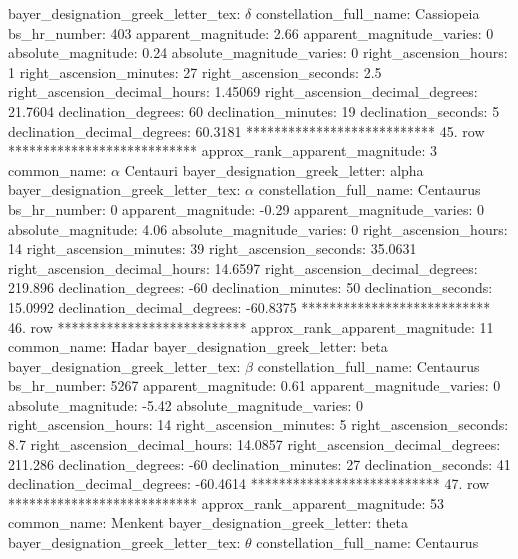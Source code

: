bayer_designation_greek_letter_tex: $\delta$
           constellation_full_name: Cassiopeia
                      bs_hr_number: 403
                apparent_magnitude: 2.66
         apparent_magnitude_varies: 0
                absolute_magnitude: 0.24
         absolute_magnitude_varies: 0
             right_ascension_hours: 1
           right_ascension_minutes: 27
           right_ascension_seconds: 2.5
     right_ascension_decimal_hours: 1.45069
   right_ascension_decimal_degrees: 21.7604
               declination_degrees: 60
               declination_minutes: 19
               declination_seconds: 5
       declination_decimal_degrees: 60.3181
*************************** 45. row ***************************
    approx_rank_apparent_magnitude: 3
                       common_name: $\alpha$ Centauri
    bayer_designation_greek_letter: alpha
bayer_designation_greek_letter_tex: $\alpha$
           constellation_full_name: Centaurus
                      bs_hr_number: 0
                apparent_magnitude: -0.29
         apparent_magnitude_varies: 0
                absolute_magnitude: 4.06
         absolute_magnitude_varies: 0
             right_ascension_hours: 14
           right_ascension_minutes: 39
           right_ascension_seconds: 35.0631
     right_ascension_decimal_hours: 14.6597
   right_ascension_decimal_degrees: 219.896
               declination_degrees: -60
               declination_minutes: 50
               declination_seconds: 15.0992
       declination_decimal_degrees: -60.8375
*************************** 46. row ***************************
    approx_rank_apparent_magnitude: 11
                       common_name: Hadar
    bayer_designation_greek_letter: beta
bayer_designation_greek_letter_tex: $\beta$
           constellation_full_name: Centaurus
                      bs_hr_number: 5267
                apparent_magnitude: 0.61
         apparent_magnitude_varies: 0
                absolute_magnitude: -5.42
         absolute_magnitude_varies: 0
             right_ascension_hours: 14
           right_ascension_minutes: 5
           right_ascension_seconds: 8.7
     right_ascension_decimal_hours: 14.0857
   right_ascension_decimal_degrees: 211.286
               declination_degrees: -60
               declination_minutes: 27
               declination_seconds: 41
       declination_decimal_degrees: -60.4614
*************************** 47. row ***************************
    approx_rank_apparent_magnitude: 53
                       common_name: Menkent
    bayer_designation_greek_letter: theta
bayer_designation_greek_letter_tex: $\theta$
           constellation_full_name: Centaurus
